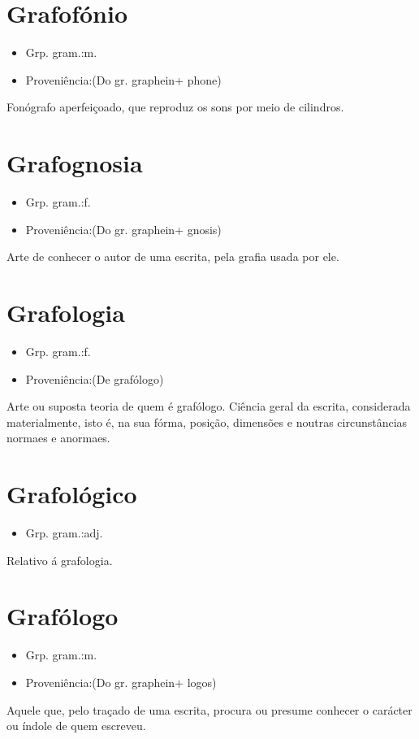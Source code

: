 \section{Grafofónio}
\begin{itemize}
\item {Grp. gram.:m.}
\end{itemize}
\begin{itemize}
\item {Proveniência:(Do gr. \textunderscore graphein\textunderscore  + \textunderscore phone\textunderscore )}
\end{itemize}
Fonógrafo aperfeiçoado, que reproduz os sons por meio de cilindros.
\section{Grafognosia}
\begin{itemize}
\item {Grp. gram.:f.}
\end{itemize}
\begin{itemize}
\item {Proveniência:(Do gr. \textunderscore graphein\textunderscore  + \textunderscore gnosis\textunderscore )}
\end{itemize}
Arte de conhecer o autor de uma escrita, pela grafia usada por ele.
\section{Grafologia}
\begin{itemize}
\item {Grp. gram.:f.}
\end{itemize}
\begin{itemize}
\item {Proveniência:(De \textunderscore grafólogo\textunderscore )}
\end{itemize}
Arte ou suposta teoria de quem é grafólogo.
Ciência geral da escrita, considerada materialmente, isto é, na sua fórma, posição, dimensões e noutras circunstâncias normaes e anormaes.
\section{Grafológico}
\begin{itemize}
\item {Grp. gram.:adj.}
\end{itemize}
Relativo á grafologia.
\section{Grafólogo}
\begin{itemize}
\item {Grp. gram.:m.}
\end{itemize}
\begin{itemize}
\item {Proveniência:(Do gr. \textunderscore graphein\textunderscore  + \textunderscore logos\textunderscore )}
\end{itemize}
Aquele que, pelo traçado de uma escrita, procura ou presume conhecer o carácter ou índole de quem escreveu.

